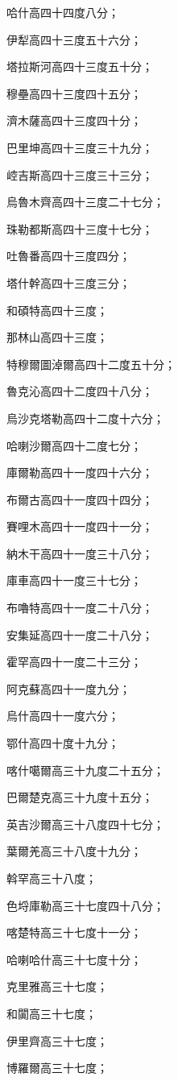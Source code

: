 \begin{pinyinscope}
哈什高四十四度八分；

伊犁高四十三度五十六分；

塔拉斯河高四十三度五十分；

穆壘高四十三度四十五分；

濟木薩高四十三度四十分；

巴里坤高四十三度三十九分；

崆吉斯高四十三度三十三分；

烏魯木齊高四十三度二十七分；

珠勒都斯高四十三度十七分；

吐魯番高四十三度四分；

塔什幹高四十三度三分；

和碩特高四十三度；

那林山高四十三度；

特穆爾圖淖爾高四十二度五十分；

魯克沁高四十二度四十八分；

烏沙克塔勒高四十二度十六分；

哈喇沙爾高四十二度七分；

庫爾勒高四十一度四十六分；

布爾古高四十一度四十四分；

賽哩木高四十一度四十一分；

納木干高四十一度三十八分；

庫車高四十一度三十七分；

布嚕特高四十一度二十八分；

安集延高四十一度二十八分；

霍罕高四十一度二十三分；

阿克蘇高四十一度九分；

烏什高四十一度六分；

鄂什高四十度十九分；

喀什噶爾高三十九度二十五分；

巴爾楚克高三十九度十五分；

英吉沙爾高三十八度四十七分；

葉爾羌高三十八度十九分；

斡罕高三十八度；

色埒庫勒高三十七度四十八分；

喀楚特高三十七度十一分；

哈喇哈什高三十七度十分；

克里雅高三十七度；

和闐高三十七度；

伊里齊高三十七度；

博羅爾高三十七度；


\end{pinyinscope}
